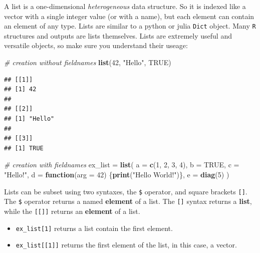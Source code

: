 \documentclass[]{book}
\newenvironment{Shaded}{\begin{snugshade}}{\end{snugshade}}
\newcommand{\KeywordTok}[1]{\textcolor[rgb]{0.13,0.29,0.53}{\textbf{#1}}}
\newcommand{\DataTypeTok}[1]{\textcolor[rgb]{0.13,0.29,0.53}{#1}}
\newcommand{\DecValTok}[1]{\textcolor[rgb]{0.00,0.00,0.81}{#1}}
\newcommand{\StringTok}[1]{\textcolor[rgb]{0.31,0.60,0.02}{#1}}
\newcommand{\CommentTok}[1]{\textcolor[rgb]{0.56,0.35,0.01}{\textit{#1}}}
\newcommand{\OtherTok}[1]{\textcolor[rgb]{0.56,0.35,0.01}{#1}}
\newcommand{\ControlFlowTok}[1]{\textcolor[rgb]{0.13,0.29,0.53}{\textbf{#1}}}
\newcommand{\NormalTok}[1]{#1}
\providecommand{\tightlist}{%
  \setlength{\itemsep}{0pt}\setlength{\parskip}{0pt}}
\theoremstyle{definition}
\theoremstyle{definition}
\theoremstyle{definition}
\theoremstyle{remark}
\begin{document}
A list is a one-dimensional \emph{heterogeneous} data structure. So it
is indexed like a vector with a single integer value (or with a name),
but each element can contain an element of any type. Lists are similar
to a python or julia \texttt{Dict} object. Many \texttt{R} structures
and outputs are lists themselves. Lists are extremely useful and
versatile objects, so make sure you understand their useage:

\begin{Shaded}
\begin{Highlighting}[]
\CommentTok{# creation without fieldnames}
\KeywordTok{list}\NormalTok{(}\DecValTok{42}\NormalTok{, }\StringTok{"Hello"}\NormalTok{, }\OtherTok{TRUE}\NormalTok{)}
\end{Highlighting}
\end{Shaded}

\begin{verbatim}
## [[1]]
## [1] 42
## 
## [[2]]
## [1] "Hello"
## 
## [[3]]
## [1] TRUE
\end{verbatim}

\begin{Shaded}
\begin{Highlighting}[]
\CommentTok{# creation with fieldnames}
\NormalTok{ex_list =}\StringTok{ }\KeywordTok{list}\NormalTok{(}
  \DataTypeTok{a =} \KeywordTok{c}\NormalTok{(}\DecValTok{1}\NormalTok{, }\DecValTok{2}\NormalTok{, }\DecValTok{3}\NormalTok{, }\DecValTok{4}\NormalTok{),}
  \DataTypeTok{b =} \OtherTok{TRUE}\NormalTok{,}
  \DataTypeTok{c =} \StringTok{"Hello!"}\NormalTok{,}
  \DataTypeTok{d =} \ControlFlowTok{function}\NormalTok{(}\DataTypeTok{arg =} \DecValTok{42}\NormalTok{) \{}\KeywordTok{print}\NormalTok{(}\StringTok{"Hello World!"}\NormalTok{)\},}
  \DataTypeTok{e =} \KeywordTok{diag}\NormalTok{(}\DecValTok{5}\NormalTok{)}
\NormalTok{)}
\end{Highlighting}
\end{Shaded}

Lists can be subset using two syntaxes, the \texttt{\$} operator, and
square brackets \texttt{{[}{]}}. The \texttt{\$} operator returns a
named \textbf{element} of a list. The \texttt{{[}{]}} syntax returns a
\textbf{list}, while the \texttt{{[}{[}{]}{]}} returns an
\textbf{element} of a list.

\begin{itemize}
\tightlist
\item
  \texttt{ex\_list{[}1{]}} returns a list contain the first element.
\item
  \texttt{ex\_list{[}{[}1{]}{]}} returns the first element of the list,
  in this case, a vector.
\end{itemize}
\end{document}

